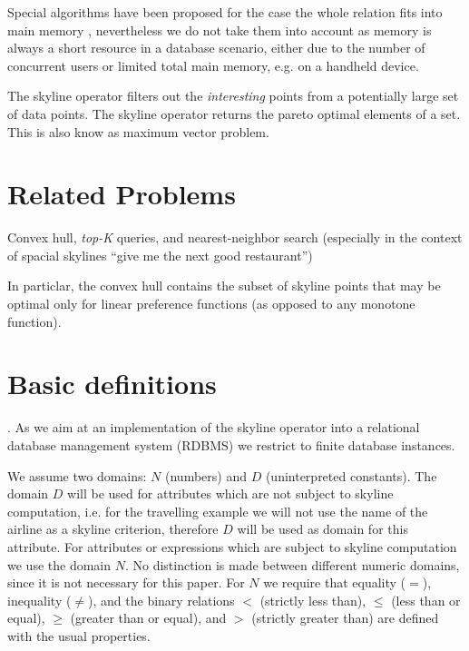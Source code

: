 Special algorithms have been proposed for the case the whole relation fits into main memory \citep{Preparata1985}, nevertheless we do not take them into account as memory is always a short resource in a database scenario, either due to the number of concurrent users or limited total main memory, e.g. on a handheld device.

The skyline operator \citep{Borzsonyi2001} filters out the \emph{interesting} points from a potentially large set of data points. The skyline operator returns the pareto optimal elements of a set. This is also know as maximum vector problem.

\section{Related Problems}
Convex hull, \emph{top-K} queries, and nearest-neighbor search (especially in the context of spacial skylines ``give me the next good restaurant'')

In particlar, the convex hull contains the subset of skyline points that may be optimal only for linear preference functions (as opposed to any monotone function).





\clearpage 
{}
\section{Basic definitions}
. As we aim at an implementation of the skyline operator into a relational database management system (RDBMS) we restrict to finite database instances.

We assume two  domains: $N$ (numbers) and $D$ (uninterpreted constants). The domain $D$ will be used for attributes which are not subject to skyline computation, i.e. for the travelling example we will not use the name of the airline as a skyline criterion, therefore $D$ will be used as domain for this attribute.
For attributes or expressions which are subject to skyline computation we use the domain $N$. No distinction is made between different numeric domains, since it is not necessary for this paper. For $N$ we require that equality ($=$), inequality ($\not=$), and the binary relations $<$ (strictly less than), $\le$ (less than or equal), $\ge$ (greater than or equal), and $>$ (strictly greater than) are defined with the usual properties.

